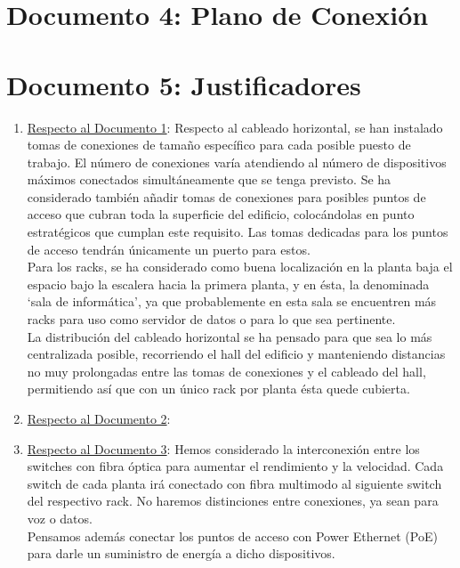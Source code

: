 \documentclass[]{article}
\begin{document}
\newpage

\section{Documento 4: Plano de Conexión}

\newpage

\section{Documento 5: Justificadores}

\begin{enumerate}[label=\alph*]
   \item \underline{Respecto al Documento 1}:
	Respecto al cableado horizontal, se han instalado tomas de conexiones de tamaño específico para cada posible puesto de trabajo. El número de conexiones varía atendiendo al número de dispositivos máximos conectados simultáneamente que se tenga previsto. Se ha considerado también añadir tomas de conexiones para posibles puntos de acceso que cubran toda la superficie del edificio, colocándolas en punto estratégicos que cumplan este requisito. Las tomas dedicadas para los puntos de acceso tendrán únicamente un puerto para estos. \\
	Para los racks, se ha  considerado como buena localización en la planta baja el espacio bajo la escalera hacia la primera planta, y en ésta, la denominada `sala de informática', ya que probablemente en esta sala se encuentren más racks para uso como servidor de datos o para lo que sea pertinente. \\
	La distribución del cableado horizontal se ha pensado para que sea lo más centralizada posible, recorriendo el hall del edificio y manteniendo distancias no muy prolongadas entre las tomas de conexiones y el cableado del hall, permitiendo así que con un único rack por planta ésta quede cubierta.
   \item \underline{Respecto al Documento 2}:
   \item \underline{Respecto al Documento 3}:
        Hemos considerado la interconexión entre los switches con fibra óptica para aumentar el rendimiento y la velocidad. Cada switch de cada planta irá conectado con fibra multimodo al siguiente switch del respectivo rack. No haremos distinciones entre conexiones, ya sean para voz o datos. \\
        Pensamos además conectar los puntos de acceso con Power Ethernet (PoE) para darle un suministro de energía a dicho dispositivos. \\

\end{enumerate}
\end{document}
